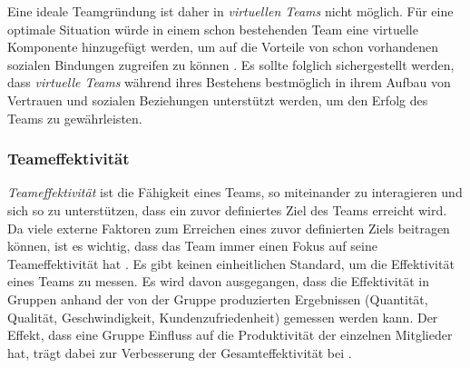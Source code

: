 \documentclass[a4paper,11pt]{article}%
\renewcommand{\\}{\vspace*{0.5\baselineskip} \newline}
\begin{document}
Eine ideale Teamgründung ist daher in \textit{virtuellen Teams} nicht möglich. 
Für eine optimale Situation würde in einem schon bestehenden Team eine virtuelle Komponente hinzugefügt werden, um auf die Vorteile von schon vorhandenen sozialen Bindungen zugreifen zu können \citep[S.36-37]{holton2001building}.
Es sollte folglich sichergestellt werden, dass \textit{virtuelle Teams} während ihres Bestehens bestmöglich in ihrem Aufbau von Vertrauen und sozialen Beziehungen unterstützt werden, um den Erfolg des Teams zu gewährleisten.
		\subsubsection{Teameffektivität}
\label{Teameffektivität}
\textit{Teameffektivität} ist die Fähigkeit eines Teams, so miteinander zu interagieren und sich so zu unterstützen, dass ein zuvor definiertes Ziel des Teams erreicht wird. Da viele externe Faktoren zum Erreichen eines zuvor definierten Ziels beitragen können, ist es wichtig, dass das Team immer einen Fokus auf seine Teameffektivität hat \citep[S.557]{salas2005there}.
	Es gibt keinen einheitlichen Standard, um die Effektivität eines Teams zu messen. Es wird davon ausgegangen, dass die Effektivität in Gruppen anhand der von der Gruppe produzierten Ergebnissen (Quantität, Qualität, Geschwindigkeit, Kundenzufriedenheit) gemessen werden kann. Der Effekt, dass eine Gruppe Einfluss auf die Produktivität der einzelnen Mitglieder hat, trägt dabei zur Verbesserung der Gesamteffektivität bei \citep[S.309]{guzzo1996teams}.
	
\end{document}
